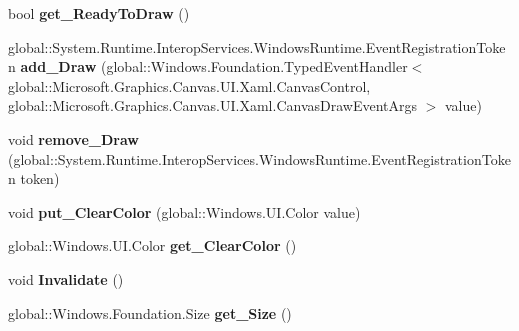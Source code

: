 \begin{DoxyCompactItemize}
bool {\bfseries get\+\_\+\+Ready\+To\+Draw} ()
\item 
\mbox{\label{class_microsoft_1_1_graphics_1_1_canvas_1_1_u_i_1_1_xaml_1_1_canvas_control_a733ea4b79b9f0c15e8be4a4701c50a33}} 
global\+::\+System.\+Runtime.\+Interop\+Services.\+Windows\+Runtime.\+Event\+Registration\+Token {\bfseries add\+\_\+\+Draw} (global\+::\+Windows.\+Foundation.\+Typed\+Event\+Handler$<$ global\+::\+Microsoft.\+Graphics.\+Canvas.\+U\+I.\+Xaml.\+Canvas\+Control, global\+::\+Microsoft.\+Graphics.\+Canvas.\+U\+I.\+Xaml.\+Canvas\+Draw\+Event\+Args $>$ value)
\item 
\mbox{\label{class_microsoft_1_1_graphics_1_1_canvas_1_1_u_i_1_1_xaml_1_1_canvas_control_ad2a843f823ae97fdab81ae2b2e2564fa}} 
void {\bfseries remove\+\_\+\+Draw} (global\+::\+System.\+Runtime.\+Interop\+Services.\+Windows\+Runtime.\+Event\+Registration\+Token token)
\item 
\mbox{\label{class_microsoft_1_1_graphics_1_1_canvas_1_1_u_i_1_1_xaml_1_1_canvas_control_ac45e4aa28ab4d2147741f75260781cfa}} 
void {\bfseries put\+\_\+\+Clear\+Color} (global\+::\+Windows.\+U\+I.\+Color value)
\item 
\mbox{\label{class_microsoft_1_1_graphics_1_1_canvas_1_1_u_i_1_1_xaml_1_1_canvas_control_ac1780376dd163f47f7d16e7470b4e96f}} 
global\+::\+Windows.\+U\+I.\+Color {\bfseries get\+\_\+\+Clear\+Color} ()
\item 
\mbox{\label{class_microsoft_1_1_graphics_1_1_canvas_1_1_u_i_1_1_xaml_1_1_canvas_control_a4676af3dd8e8a8a5bedabb4a172949db}} 
void {\bfseries Invalidate} ()
\item 
\mbox{\label{class_microsoft_1_1_graphics_1_1_canvas_1_1_u_i_1_1_xaml_1_1_canvas_control_a49e67369dc1fe3f019a64f6fdd0342cb}} 
global\+::\+Windows.\+Foundation.\+Size {\bfseries get\+\_\+\+Size} ()
\item 

\end{DoxyCompactItemize}
